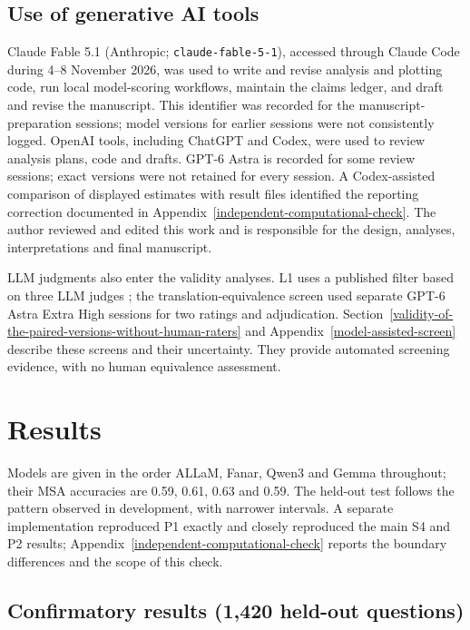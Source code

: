 \documentclass[applsci,article,submit,pdftex,oneauthor]{Definitions/mdpi}
\begin{document}
\hypertarget{use-of-generative-ai-tools}{%
\subsection{Use of generative AI tools}\label{use-of-generative-ai-tools}}

Claude Fable 5.1 (Anthropic; \nolinkurl{claude-fable-5-1}), accessed through Claude Code during 4--8 November 2026, was used to write and revise analysis and plotting code, run local model-scoring workflows, maintain the claims ledger, and draft and revise the manuscript. This identifier was recorded for the manuscript-preparation sessions; model versions for earlier sessions were not consistently logged. OpenAI tools, including ChatGPT and Codex, were used to review analysis plans, code and drafts. GPT-6 Astra is recorded for some review sessions; exact versions were not retained for every session. A Codex-assisted comparison of displayed estimates with result files identified the reporting correction documented in Appendix~\ref{independent-computational-check}. The author reviewed and edited this work and is responsible for the design, analyses, interpretations and final manuscript.

LLM judgments also enter the validity analyses. L1 uses a published filter based on three LLM judges \cite{ifm2026verified}; the translation-equivalence screen used separate GPT-6 Astra Extra High sessions for two ratings and adjudication. Section~\ref{validity-of-the-paired-versions-without-human-raters} and Appendix~\ref{model-assisted-screen} describe these screens and their uncertainty. They provide automated screening evidence, with no human equivalence assessment.

\hypertarget{results}{%
\section{Results}\label{results}}

Models are given in the order ALLaM, Fanar, Qwen3 and Gemma throughout; their MSA accuracies are 0.59, 0.61, 0.63 and 0.59. The held-out test follows the pattern observed in development, with narrower intervals. A separate implementation reproduced P1 exactly and closely reproduced the main S4 and P2 results; Appendix~\ref{independent-computational-check} reports the boundary differences and the scope of this check.

\hypertarget{confirmatory-results-1420-held-out-questions}{%
\subsection{Confirmatory results (1,420 held-out questions)}\label{confirmatory-results-1420-held-out-questions}}
\end{document}
